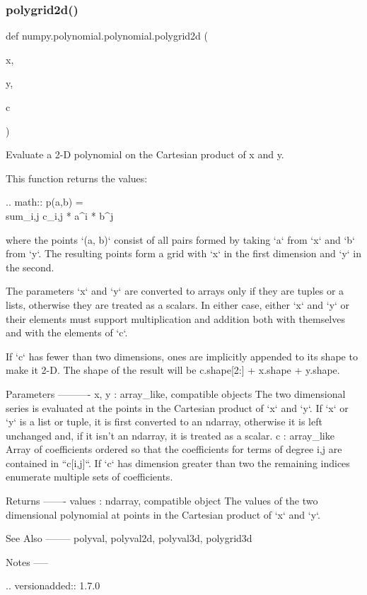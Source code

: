 \subsubsection{\texorpdfstring{polygrid2d()}{polygrid2d()}}
{\footnotesize\ttfamily def numpy.\+polynomial.\+polynomial.\+polygrid2d (\begin{DoxyParamCaption}\item[{}]{x,  }\item[{}]{y,  }\item[{}]{c }\end{DoxyParamCaption})}

\begin{DoxyVerb}Evaluate a 2-D polynomial on the Cartesian product of x and y.

This function returns the values:

.. math:: p(a,b) = \\sum_{i,j} c_{i,j} * a^i * b^j

where the points `(a, b)` consist of all pairs formed by taking
`a` from `x` and `b` from `y`. The resulting points form a grid with
`x` in the first dimension and `y` in the second.

The parameters `x` and `y` are converted to arrays only if they are
tuples or a lists, otherwise they are treated as a scalars. In either
case, either `x` and `y` or their elements must support multiplication
and addition both with themselves and with the elements of `c`.

If `c` has fewer than two dimensions, ones are implicitly appended to
its shape to make it 2-D. The shape of the result will be c.shape[2:] +
x.shape + y.shape.

Parameters
----------
x, y : array_like, compatible objects
    The two dimensional series is evaluated at the points in the
    Cartesian product of `x` and `y`.  If `x` or `y` is a list or
    tuple, it is first converted to an ndarray, otherwise it is left
    unchanged and, if it isn't an ndarray, it is treated as a scalar.
c : array_like
    Array of coefficients ordered so that the coefficients for terms of
    degree i,j are contained in ``c[i,j]``. If `c` has dimension
    greater than two the remaining indices enumerate multiple sets of
    coefficients.

Returns
-------
values : ndarray, compatible object
    The values of the two dimensional polynomial at points in the Cartesian
    product of `x` and `y`.

See Also
--------
polyval, polyval2d, polyval3d, polygrid3d

Notes
-----

.. versionadded:: 1.7.0\end{DoxyVerb}
 \mbox{\label{namespacenumpy_1_1polynomial_1_1polynomial_ab35abbd26b79aafb0f8e104e5b5d3b6e}} 
